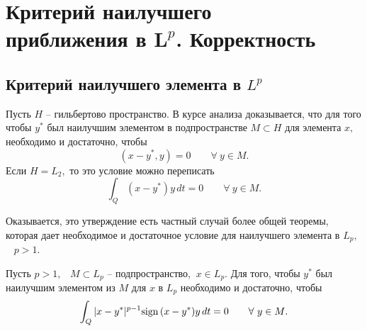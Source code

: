 
\chapter{Критерий наилучшего \\
 приближения в $\boldsymbol L^p$. Корректность}


 \section{Критерий наилучшего элемента в $L^p$}

 Пусть $H$ -- гильбертово пространство. В курсе анализа
 доказывается, что для того чтобы $y^*$ был наилучшим элементом в
 подпространстве
 $M\subset H$ для элемента $x,$ необходимо и достаточно, чтобы
 $$
 (x-y^*,y)=0\qquad \forall\  y\in M.
 $$
 Если $H=L_2,$ то это условие можно переписать
 $$
 \int_Q (x-y^*)y\, dt=0\qquad \forall\  y\in M.
 $$


 Оказывается, это утверждение есть частный
 случай более общей теоремы, которая дает необходимое
 и достаточное условие для наилучшего элемента в $L_p,$~ $p>1.$

 \begin{teo} %
 Пусть $p>1,$~ $M\subset L_p$ -- подпространство, $ \ x\in L_p.$
 Для того, чтобы $y^*$ был наилучшим элементом из $M$ для $x$
 в $L_p$ необходимо и достаточно, чтобы
 \begin{equation}\label{f9-1}
 {\int_Q |x-y^*|^{p-1} {\rm sign \, }(x-y^*)y\, dt=0} {\qquad \forall\  y\in M}.
 \end{equation}
 \end{teo}

